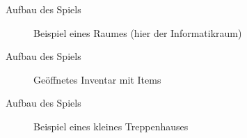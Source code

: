 \begin{frame}{Aufbau des Spiels}
	\begin{figure}
		\centering
		\caption[Informatikraum]{Beispiel eines Raumes (hier der Informatikraum)}
		\label{fig:Informatikraum}
	\end{figure}
\end{frame}

\begin{frame}{Aufbau des Spiels}
	\begin{figure}
		\centering
		\caption[Inventar]{Geöffnetes Inventar mit Items}
		\label{fig:Inventar}
	\end{figure}
\end{frame}

\begin{frame}{Aufbau des Spiels}
	\begin{figure}
		\centering
		\caption[kleines Treppenhaus]{Beispiel eines kleines Treppenhauses}
		\label{fig:kleines Treppenhaus}
	\end{figure}
\end{frame}